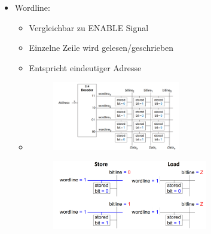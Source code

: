 \documentclass[11pt,a4paper]{article}
\begin{document}
\begin{itemize}
\begin{itemize}
	\item Wordline:
		\begin{itemize}
		\item Vergleichbar zu ENABLE Signal
		\item Einzelne Zeile wird gelesen/geschrieben
		\item Entspricht eindeutiger Adresse
		\item[]
			\begin{minipage}{0.4\textwidth}
				\begin{figure}[H]
				\includegraphics[height=3cm]{wordline}
				\end{figure}
			\end{minipage}
			\begin{minipage}[t]{0.45\textwidth}
				\vspace{-1.75cm}
				\begin{figure}[H]
				\includegraphics[height=3cm]{wordline2}
				\end{figure}
			\end{minipage}
		\end{itemize}
	\end{itemize}

\pagebreak


\end{itemize}
\end{document}
